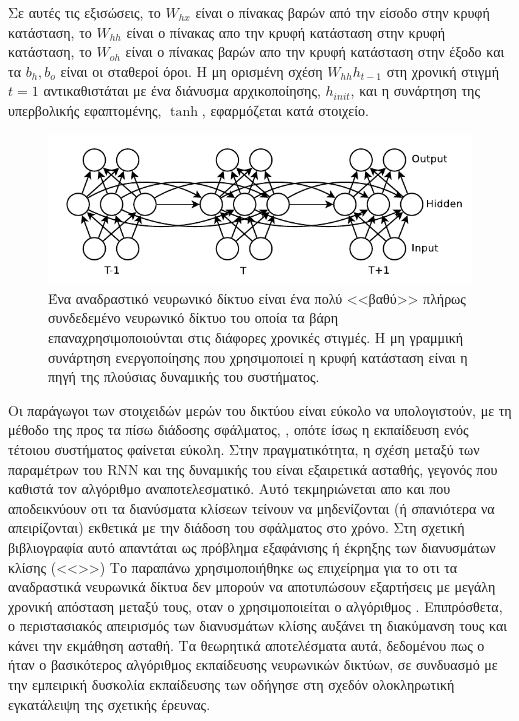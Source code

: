 
Σε αυτές τις εξισώσεις, το $W_{hx}$ είναι ο πίνακας βαρών από την είσοδο στην κρυφή κατάσταση, το $W_{hh}$ είναι ο πίνακας απο την κρυφή κατάσταση στην κρυφή κατάσταση, το $W_{oh}$ είναι ο πίνακας βαρών απο την κρυφή κατάσταση στην έξοδο και τα $b_h, b_o$ είναι οι σταθεροί όροι.
Η μη ορισμένη σχέση $W_{hh}h_{t-1}$ στη χρονική στιγμή $t = 1$ αντικαθιστάται με ένα διάνυσμα αρχικοποίησης, $h_{init}$, και η συνάρτηση της υπερβολικής εφαπτομένης, $\tanh$, εφαρμόζεται κατά στοιχείο.

\begin{figure}[tph]
	\includegraphics[width=\textwidth, keepaspectratio]{images/rnn.png}
	\centering 
	\caption{Ένα αναδραστικό νευρωνικό δίκτυο είναι ένα πολύ <<βαθύ>> πλήρως συνδεδεμένο νευρωνικό 			δίκτυο του οποία τα βάρη επαναχρησιμοποιούνται στις διάφορες χρονικές στιγμές. Η μη 					γραμμική συνάρτηση ενεργοποίησης που χρησιμοποιεί η κρυφή κατάσταση είναι η πηγή της 					πλούσιας δυναμικής του συστήματος.}
	\label{fig:rnn}
\end{figure}

Οι παράγωγοι των στοιχειδών μερών του δικτύου είναι εύκολο να υπολογιστούν, με τη μέθοδο της προς τα πίσω διάδοσης σφάλματος, \cite{Graves2013}, \cite{Rieman2014} οπότε ίσως η εκπαίδευση ενός τέτοιου συστήματος φαίνεται εύκολη.
Στην πραγματικότητα, η σχέση μεταξύ των παραμέτρων του RNN και της δυναμικής του είναι εξαιρετικά ασταθής, γεγονός που καθιστά τον αλγόριθμο  αναποτελεσματικό.
Αυτό τεκμηριώνεται απο \cite{tofill} και \cite{tofill} που αποδεικνύουν οτι τα διανύσματα κλίσεων τείνουν να μηδενίζονται (ή σπανιότερα να απειρίζονται) εκθετικά με την διάδοση του σφάλματος στο χρόνο.
Στη σχετική βιβλιογραφία αυτό απαντάται ως πρόβλημα εξαφάνισης ή έκρηξης των διανυσμάτων κλίσης (<<>>)
Το παραπάνω χρησιμοποιήθηκε ως επιχείρημα για το οτι τα αναδραστικά νευρωνικά δίκτυα δεν μπορούν να αποτυπώσουν εξαρτήσεις με μεγάλη χρονική απόσταση μεταξύ τους, οταν ο χρησιμοποιείται ο αλγόριθμος .
Επιπρόσθετα, ο περιστασιακός απειρισμός των διανυσμάτων κλίσης αυξάνει τη διακύμανση τους και κάνει την εκμάθηση ασταθή.
Τα θεωρητικά αποτελέσματα αυτά, δεδομένου πως ο  ήταν ο βασικότερος αλγόριθμος εκπαίδευσης νευρωνικών δικτύων, σε συνδυασμό με την εμπειρική δυσκολία εκπαίδευσης των  οδήγησε στη σχεδόν ολοκληρωτική εγκατάλειψη της σχετικής έρευνας.


